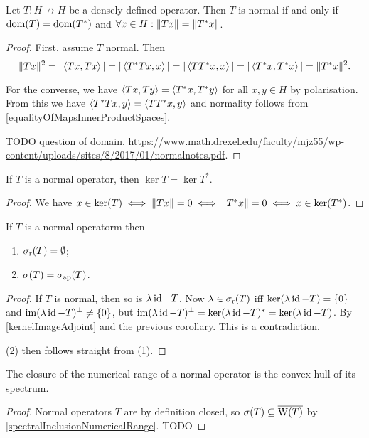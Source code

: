 \begin{proposition}
Let $T: H\not\to H$ be a densely defined operator. Then $T$ is normal \textup{if and only if} $\operatorname{dom}(T) = \operatorname{dom}(T^*)$ and $\forall x\in H: \lVert Tx\rVert = \lVert T^*x\rVert$.
\end{proposition}
\begin{proof}
First, assume $T$ normal. Then
\[ \lVert Tx\rVert^2 = |\left\langle Tx,Tx \right\rangle| = |\left\langle T^*Tx,x \right\rangle| = |\left\langle TT^*x,x \right\rangle| = |\left\langle T^*x,T^*x \right\rangle| = \lVert T^*x\rVert^2. \]

For the converse, we have $\left\langle Tx, Ty \right\rangle = \left\langle T^*x, T^* y \right\rangle$ for all $x,y\in H$ by polarisation. From this we have $\left\langle T^*Tx, y \right\rangle = \left\langle TT^*x, y \right\rangle$ and normality follows from \ref{equalityOfMapsInnerProductSpaces}.

TODO question of domain.
\url{https://www.math.drexel.edu/faculty/mjz55/wp-content/uploads/sites/8/2017/01/normalnotes.pdf}.
\end{proof}
\begin{corollary} \label{equalityKernelAdjointNormal}
If $T$ is a normal operator, then $\ker T = \ker T^*$.
\end{corollary}
\begin{proof}
We have $x\in\ker(T) \iff \lVert Tx\rVert = 0 \iff \lVert T^*x\rVert = 0 \iff x\in\ker(T^*)$. 
\end{proof}
\begin{corollary}
If $T$ is a normal operatorm then
\begin{enumerate}
\item $\sigma_\text{r}(T) = \emptyset$;
\item $\sigma(T) = \sigma_\text{ap}(T)$.
\end{enumerate} 
\end{corollary}
\begin{proof}
If $T$ is normal, then so is $\lambda\operatorname{id}-T$. Now $\lambda\in\sigma_\text{r}(T)$ iff $\ker(\lambda\operatorname{id} - T) = \{0\}$ and $\operatorname{im}(\lambda\operatorname{id}-T)^\perp \neq \{0\}$, but $\operatorname{im}(\lambda\operatorname{id}-T)^\perp = \ker(\lambda\operatorname{id}-T)^* = \ker(\lambda\operatorname{id}-T)$. By \ref{kernelImageAdjoint} and the previous corollary. This is a contradiction.

(2) then follows straight from (1).
\end{proof}

\begin{theorem} \label{closureNumericRangeConvexHullSpectrum}
The closure of the numerical range of a normal operator is the
convex hull of its spectrum.
\end{theorem}
\begin{proof}
Normal operators $T$ are by definition closed, so $\sigma(T)\subseteq \overline{\operatorname{W}(T)}$ by \ref{spectralInclusionNumericalRange}. TODO
\end{proof}

